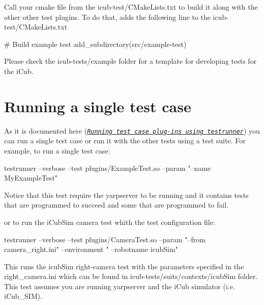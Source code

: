 Call your cmake file from the {\ttfamily icub-\/test/\+C\+Make\+Lists.\+txt} to build it along with the other other test plugins. To do that, adds the following line to the {\ttfamily icub-\/test/\+C\+Make\+Lists.\+txt}


\begin{DoxyCode}
\textcolor{preprocessor}{# Build example test }
\textcolor{preprocessor}{add\_subdirectory(src/example-test)}
\end{DoxyCode}


Please check the {\ttfamily icub-\/tests/example} folder for a template for developing tests for the i\+Cub.\hypertarget{writing-and-running_running_single_test_case}{}\section{Running a single test case}\label{writing-and-running_running_single_test_case}
As it is documented here (\href{http://robotology.github.io/robot-testing/documentation/testrunner.html}{\tt {\itshape Running test case plug-\/ins using testrunner}}) you can run a single test case or run it with the other tests using a test suite. For example, to run a single test case\+:


\begin{DoxyCode}
testrunner --verbose --test plugins/ExampleTest.so  --param \textcolor{stringliteral}{"--name MyExampleTest"}
\end{DoxyCode}


Notice that this test require the {\ttfamily yarpserver} to be running and it contains tests that are programmed to succeed and some that are programmed to fail.

or to run the i\+Cub\+Sim camera test whith the test configuration file\+:


\begin{DoxyCode}
testrunner --verbose --test plugins/CameraTest.so --param \textcolor{stringliteral}{"--from camera\_right.ini"} --environment \textcolor{stringliteral}{"
      --robotname icubSim"}
\end{DoxyCode}


This runs the icub\+Sim right-\/camera test with the parameters specified in the {\ttfamily right\+\_\+camera.\+ini} which can be found in {\ttfamily icub-\/tests/suits/contexts/icub\+Sim} folder. This test assumes you are running {\ttfamily yarpserver} and the i\+Cub simulator (i.\+e. {\ttfamily i\+Cub\+\_\+\+S\+IM}).

